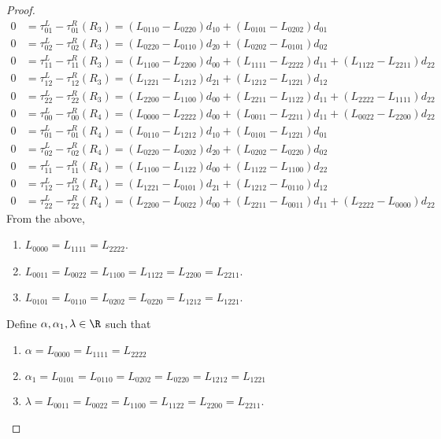 \begin{proof}
\begin{align}
        0 &= \tau^L_{01} - \tau^R_{01}(R_3) = (L_{0110} - L_{0220})d_{10} + (L_{0101} - L_{0202})d_{01} \\
        0 &= \tau^L_{02} - \tau^R_{02}(R_3) = (L_{0220} - L_{0110})d_{20} + (L_{0202} - L_{0101})d_{02} \\
        0 &= \tau^L_{11} - \tau^R_{11}(R_3) = (L_{1100} - L_{2200})d_{00} + (L_{1111} - L_{2222})d_{11} + (L_{1122} - L_{2211})d_{22} \\
        0 &= \tau^L_{12} - \tau^R_{12}(R_3) = (L_{1221} - L_{1212})d_{21} + (L_{1212} - L_{1221})d_{12} \\
        0 &= \tau^L_{22} - \tau^R_{22}(R_3) = (L_{2200} - L_{1100})d_{00} + (L_{2211} - L_{1122})d_{11} + (L_{2222} - L_{1111})d_{22} \\
        0 &= \tau^L_{00} - \tau^R_{00}(R_4) = (L_{0000} - L_{2222})d_{00} + (L_{0011} - L_{2211})d_{11} + (L_{0022} - L_{2200})d_{22} \\
        0 &= \tau^L_{01} - \tau^R_{01}(R_4) = (L_{0110} - L_{1212})d_{10} + (L_{0101} - L_{1221})d_{01} \\
        0 &= \tau^L_{02} - \tau^R_{02}(R_4) = (L_{0220} - L_{0202})d_{20} + (L_{0202} - L_{0220})d_{02} \\
        0 &= \tau^L_{11} - \tau^R_{11}(R_4) = (L_{1100} - L_{1122})d_{00} + (L_{1122} - L_{1100})d_{22} \\
        0 &= \tau^L_{12} - \tau^R_{12}(R_4) = (L_{1221} - L_{0101})d_{21} + (L_{1212} - L_{0110})d_{12} \\
        0 &= \tau^L_{22} - \tau^R_{22}(R_4) = (L_{2200} - L_{0022})d_{00} + (L_{2211} - L_{0011})d_{11} + (L_{2222} - L_{0000})d_{22}
    \end{align}
    From the above,
    \begin{enumerate}
        \item $L_{0000} = L_{1111} = L_{2222}$.
        \item $L_{0011} = L_{0022} = L_{1100} = L_{1122} = L_{2200} = L_{2211}$.
        \item $L_{0101} = L_{0110} = L_{0202} = L_{0220} = L_{1212} = L_{1221}$.
    \end{enumerate}
    Define  $\alpha, \alpha_1,\lambda \in \R$ such that
    \begin{enumerate}
        \item $\alpha = L_{0000} = L_{1111} = L_{2222}$
        \item $\alpha_1 = L_{0101} = L_{0110} = L_{0202} = L_{0220} = L_{1212} = L_{1221}$
        \item $\lambda = L_{0011} = L_{0022} = L_{1100} = L_{1122} = L_{2200} = L_{2211}$.

\end{enumerate}
\end{proof}

